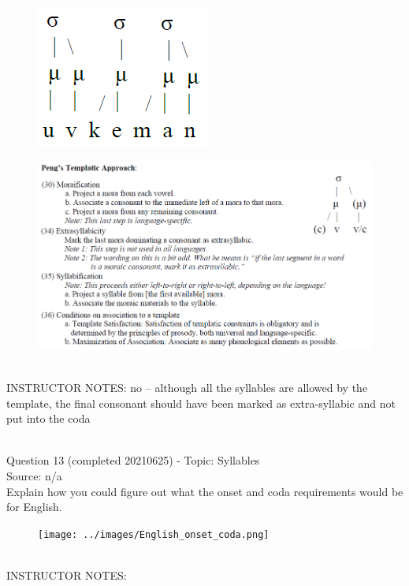 \documentclass[12pt]{article}
\begin{document}
\begin{figure}[H]
\includegraphics{../images/pengtemplate_uvkeman_no.png}
\end{figure}
\begin{figure}[H]
\includegraphics{../images/peng_template_withdiagram.png}
\end{figure}

~\\
INSTRUCTOR NOTES: no -- although all the syllables are allowed by the template, the final consonant should have been marked as extra-syllabic and not put into the coda


~\\

{\large Question 13} (completed 20210625) - Topic: Syllables\\
Source: n/a\\

Explain how you could figure out what the onset and coda requirements would be for English.\\

\begin{figure}[H]
\texttt{[image: ../images/English\_onset\_coda.png]}
\end{figure}

~\\
INSTRUCTOR NOTES: 
\end{document}
